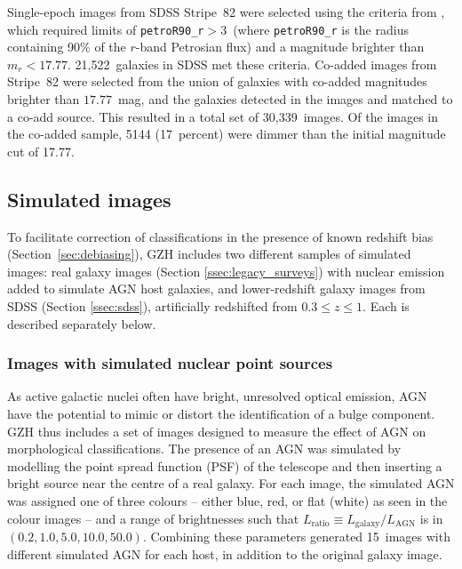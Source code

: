 \documentclass[a4paper,fleqn,usenatbib]{mnras}
\begin{document}
Single-epoch images from SDSS Stripe~82 were selected using the criteria
from \citet{wil13}, which required limits of \texttt{petroR90\_r}$ >
3$\arcsec~(where \texttt{petroR90\_r} is the radius containing 90\% of the
$r$-band Petrosian flux) and a magnitude brighter than $m_r < 17.77$.
21,522~galaxies in SDSS met these criteria.
Co-added images from Stripe~82 were selected from the union of galaxies with
co-added magnitudes brighter than $17.77$~mag, and the galaxies detected in the
\stripe{} images and matched to a co-add source. This resulted in a total
set of 30,339~images. Of the images in the co-added sample, 5144 (17~percent)
were dimmer than the initial magnitude cut of 17.77. 


\subsection{Simulated \hst{} images}\label{ssec:simulatedimages}

To facilitate correction of classifications in the presence of known redshift
bias (Section~\ref{sec:debiasing}), GZH includes two different samples of
simulated \hst{} images: real \hst{} galaxy images (Section
\ref{ssec:legacy_surveys}) with nuclear emission added to simulate AGN host
galaxies, and lower-redshift galaxy images from SDSS (Section \ref{ssec:sdss}),
artificially redshifted from $0.3 \leq z \leq 1$.  Each is described separately
below. 

\subsubsection{Images with simulated nuclear point sources}\label{ssec:sim_agn}

As active galactic nuclei often have bright, unresolved optical emission, AGN
have the potential to mimic or distort the identification of a bulge component.
GZH thus includes a set of images designed to measure the effect of AGN on
morphological classifications.  The presence of an AGN was simulated by
modelling the point spread function (PSF) of the telescope and then inserting a
bright source near the centre of a real galaxy. For each image, the simulated
AGN was assigned one of three colours -- either blue, red, or flat (white) as
seen in the colour images -- and a range of brightnesses such that
$L_\mathrm{ratio} \equiv L_\mathrm{galaxy}/L_\mathrm{AGN}$ is in
$(0.2,1.0,5.0,10.0,50.0)$. Combining these parameters generated 15~images
with different simulated AGN for each host, in addition to the original galaxy
image. 
\end{document}
